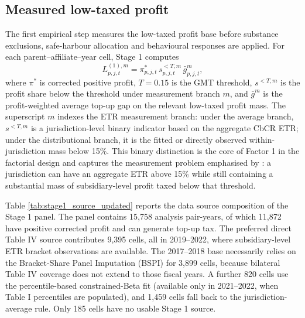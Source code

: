 \documentclass[11pt,a4paper]{article}
\begin{document}
\subsection{Measured low-taxed profit}\label{sec:results_stage1}

The first empirical step measures the low-taxed profit base before substance exclusions, safe-harbour allocation and behavioural responses are applied. For each parent--affiliate--year cell, Stage 1 computes
\begin{equation}\label{eq:results_stage1_liability}
L_{p,j,t}^{(1),m}
= \pi_{p,j,t}^{*}\, s_{p,j,t}^{<T,m}\, \bar{g}_{p,j,t}^{m},
\end{equation}
where $\pi^{*}$ is corrected positive profit, $T=0.15$ is the GMT threshold, $s^{<T,m}$ is the profit share below the threshold under measurement branch $m$, and $\bar{g}^{m}$ is the profit-weighted average top-up gap on the relevant low-taxed profit mass. The superscript $m$ indexes the ETR measurement branch: under the average branch, $s^{<T,m}$ is a jurisdiction-level binary indicator based on the aggregate CbCR ETR; under the distributional branch, it is the fitted or directly observed within-jurisdiction mass below 15\%. This binary distinction is the core of Factor 1 in the factorial design and captures the measurement problem emphasised by \citet{hugger2026}: a jurisdiction can have an aggregate ETR above 15\% while still containing a substantial mass of subsidiary-level profit taxed below that threshold.




Table \ref{tab:stage1_source_updated} reports the data source composition of the Stage 1 panel. The panel contains 15{,}758 analysis pair-years, of which 11{,}872 have positive corrected profit and can generate top-up tax. The preferred direct Table IV source contributes 9{,}395 cells, all in 2019--2022, where subsidiary-level ETR bracket observations are available. The 2017--2018 base necessarily relies on the Bracket-Share Panel Imputation (BSPI) for 3{,}899 cells, because bilateral Table IV coverage does not extend to those fiscal years. A further 820 cells use the percentile-based constrained-Beta fit (available only in 2021--2022, when Table I percentiles are populated), and 1{,}459 cells fall back to the jurisdiction-average rule. Only 185 cells have no usable Stage 1 source.
\end{document}
